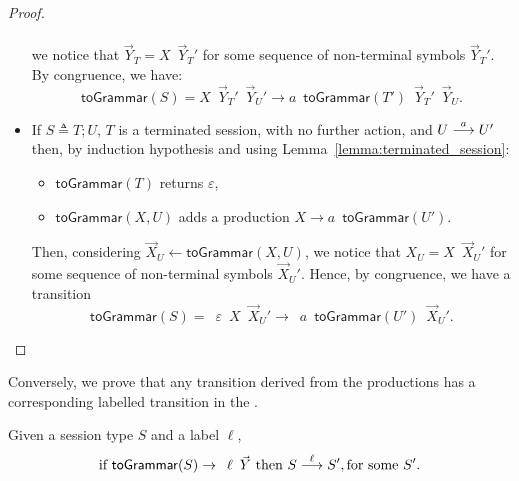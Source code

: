 \begin{proof}
\begin{itemize}
\begin{align*}
		\end{align*}
		we notice that $\vec Y_T = X \enspace \vec Y_T'$ for some 
		sequence of non-terminal symbols $\vec Y_T'$. By congruence, we have: 
		\[\mathsf{toGrammar}(S) = X \enspace \vec Y_T' \enspace \vec Y_U' 
		\rightarrow a \enspace \mathsf{toGrammar}(T') \enspace \vec  Y_T' 
		\enspace \vec Y_U.\]
	\item If $S\triangleq T;U$, $T$ is a terminated session, with no further 
	      action, and $U \LTSderives[a] U'$ then, by induction hypothesis and 
	      using Lemma~\ref{lemma:terminated_session}:
	    \begin{itemize}
			\item $\mathsf{toGrammar}(T)$  returns $\varepsilon$,
			\item $\mathsf{toGrammar}(X,U)$  adds a production 
			$X \rightarrow a \enspace \mathsf{toGrammar}(U')$.
		\end{itemize}
		Then, considering $\vec X_U \leftarrow \mathsf{toGrammar}(X,U)$, 
		we notice that $X_U = X \enspace \vec X_U'$ for some sequence of 
		non-terminal symbols $\vec X_U'$. Hence, by congruence, we have a 
		transition 
		\[\mathsf{toGrammar}(S) = \enspace \varepsilon \enspace X \enspace 
		\vec X_U' \rightarrow \enspace a \enspace \mathsf{toGrammar}(U') \enspace 
		\vec X_U'.\]
\end{itemize}
\end{proof}

Conversely, we prove that any transition derived from the productions 
has a corresponding labelled transition in the \LTS.

\begin{lemma}
Given a session type $S$ and a label $\ell$,
	\[ \text{if } \mathsf{toGrammar}(S) \rightarrow \enspace \ell \enspace 
	 \vec Y \text{ then } S \LTSderives[\ell] S', \text{for some $S'$}.\]
\end{lemma}


